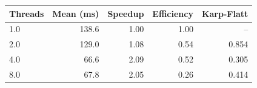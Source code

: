 \begin{tabular}{lrrrr}
\toprule
Threads & Mean (ms) & Speedup & Efficiency & Karp-Flatt \\
\midrule
1.0 & 138.6 & 1.00 & 1.00 & -- \\
2.0 & 129.0 & 1.08 & 0.54 & 0.854 \\
4.0 & 66.6 & 2.09 & 0.52 & 0.305 \\
8.0 & 67.8 & 2.05 & 0.26 & 0.414 \\
\bottomrule
\end{tabular}

